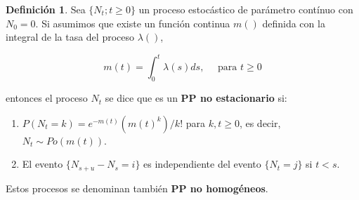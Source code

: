 \documentclass[
]{book}
\providecommand{\tightlist}{%
  \setlength{\itemsep}{0pt}\setlength{\parskip}{0pt}}
\newenvironment{yellowbox}{
  \definecolor{shadecolor}{rgb}{210, 180, 140}  
  \color{black}
  \begin{shaded}}
 {\end{shaded}}
\theoremstyle{definition}
\newtheorem{definition}{Definición}[chapter]
\theoremstyle{definition}
\theoremstyle{definition}
\theoremstyle{definition}
\theoremstyle{remark}
\begin{document}
\begin{yellowbox}

\begin{definition}
\protect\hypertarget{def:ppnohomogeneo}{}\label{def:ppnohomogeneo}Sea \(\{N_t; t \geq 0\}\) un proceso estocástico de parámetro contínuo con \(N_0 = 0\). Si asumimos que existe un función continua \(m()\) definida con la integral de la tasa del proceso \(\lambda()\),

\[m(t) = \int_0^t \lambda(s)ds, \quad \text{ para } t \geq 0\]

entonces el proceso \(N_t\) se dice que es un \textbf{PP no estacionario} si:

\begin{enumerate}
\def\labelenumi{\arabic{enumi}.}
\tightlist
\item
  \(P(N_t = k) = e^{-m(t)}(m(t)^k)/k!\) para \(k, t \geq 0\), es decir, \(N_t \sim Po(m(t))\).
\item
  El evento \(\{N_{s+u} - N_s = i\}\) es independiente del evento \(\{N_t = j\}\) si \(t<s\).
\end{enumerate}

Estos procesos se denominan también \textbf{PP no homogéneos}.
\end{definition}

\end{yellowbox}
\end{document}
